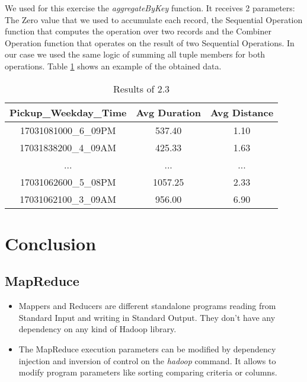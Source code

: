 \documentclass[conference,compsoc]{IEEEtran}
\begin{document}
We used for this exercise the \textit{aggregateByKey} function. It receives 2 parameters: The Zero value that we used to accumulate each record, the Sequential Operation function that computes the operation over two records and the Combiner Operation function that operates on the result of two Sequential Operations. In our case we used the same logic of summing all tuple members for both operations. Table \ref{output_2_3} shows an example of the obtained data.

\begin{table}[!t]
\renewcommand{\arraystretch}{1.3}
\caption{Results of 2.3}
\label{output_2_3}
\centering
\begin{tabular}{c||c|c}
\hline
\bfseries Pickup\_Weekday\_Time & \bfseries Avg Duration & \bfseries Avg Distance\\
\hline\hline
17031081000\_6\_09PM & 537.40 & 1.10\\
17031838200\_4\_09AM & 425.33 & 1.63\\
... & ... & ...\\
17031062600\_5\_08PM & 1057.25 & 2.33\\
17031062100\_3\_09AM & 956.00 & 6.90\\
\hline
\end{tabular}
\end{table}
\section{Conclusion}

\subsection{MapReduce}
\begin{itemize}
\item Mappers and Reducers are different standalone programs reading from Standard Input and writing in Standard Output. They don't have any dependency on any kind of Hadoop library.
\item The MapReduce execution parameters can be modified by dependency injection and inversion of control on the \textit{hadoop} command. It allows to modify program parameters like sorting comparing criteria or columns.
\end{itemize}
\end{document}
